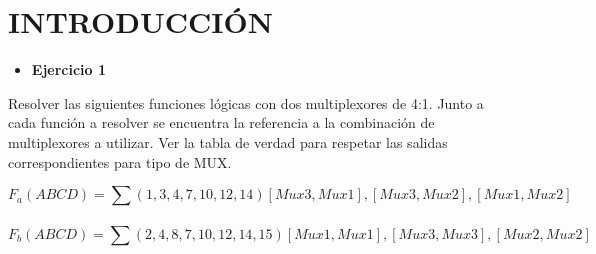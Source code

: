 \section{INTRODUCCIÓN}
\begin{itemize}[nosep]\item \textbf{Ejercicio 1} \end{itemize}
\sangria{} Resolver las siguientes funciones lógicas con dos multiplexores de 4:1. Junto a cada función a resolver se encuentra la referencia a la combinación de multiplexores a utilizar. Ver la tabla de verdad para respetar las salidas correspondientes para tipo de MUX.
\begin{center}\Large
    \[  F_a(ABCD) = \sum (1,3,4,7,10,12,14) [Mux3, Mux1], [Mux3, Mux2], [Mux1, Mux2]   \] \\
    \[ F_b (ABCD) = \sum (2,4,8,7,10,12,14,15)[Mux1,Mux1], [Mux3,Mux3], [Mux2, Mux2] \]
\end{center}
